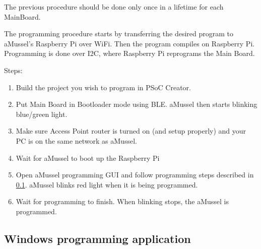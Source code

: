 The previous procedure should be done only once in a lifetime for each MainBoard. 

The programming procedure starts by transferring the desired program to aMussel's Raspberry Pi over WiFi. Then the program compiles on Raspberry Pi. Programming is done over I2C, where Raspberry Pi reprograms the Main Board.

Steps:
\begin{enumerate}
	\item Build the project you wish to program in PSoC Creator.
	\item Put Main Board in Bootloader mode using BLE. aMussel then starts blinking blue/green light.
	\item Make sure Access Point router is turned on (and setup properly) and your PC is on the same network as aMussel.
	\item Wait for aMussel to boot up the Raspberry Pi 
	\item Open aMussel programming GUI and follow programming steps described in \ref{subsec:win_prog_app}. aMussel blinks red light when it is being programmed.
	\item Wait for programming to finish. When blinking stops, the aMussel is programmed.
\end{enumerate}

\subsection{Windows programming application}
\label{subsec:win_prog_app}

